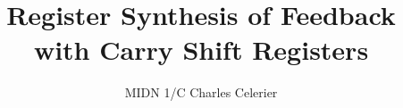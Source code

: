 \documentclass[english]{article}
\theoremstyle{plain}
\theoremstyle{definition}
\theoremstyle{remark}
\begin{document}
\title{Register Synthesis of Feedback with Carry Shift Registers}
\author{MIDN 1/C Charles Celerier}
\maketitle








\end{document}
